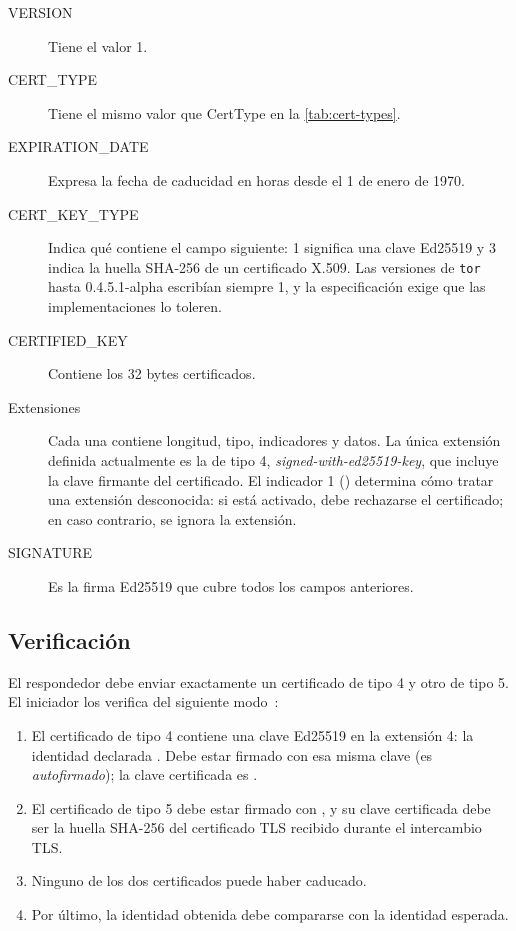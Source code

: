 \begin{description}
  \item[VERSION] Tiene el valor 1.
  \item[CERT\_TYPE] Tiene el mismo valor que CertType en la \cref{tab:cert-types}.
  \item[EXPIRATION\_DATE] Expresa la fecha de caducidad en horas desde el 1 de enero de 1970.
  \item[CERT\_KEY\_TYPE] Indica qué contiene el campo siguiente: 1 significa una clave Ed25519 y 3 indica la huella SHA-256 de un certificado X.509. Las versiones de \texttt{tor} hasta 0.4.5.1-alpha escribían siempre 1, y la especificación exige que las implementaciones lo toleren.
  \item[CERTIFIED\_KEY] Contiene los 32 bytes certificados.
  \item[Extensiones] Cada una contiene longitud, tipo, indicadores y datos. La única extensión definida actualmente es la de tipo 4, \emph{signed-with-ed25519-key}, que incluye la clave firmante del certificado. El indicador 1 () determina cómo tratar una extensión desconocida: si está activado, debe rechazarse el certificado; en caso contrario, se ignora la extensión.
  \item[SIGNATURE] Es la firma Ed25519 que cubre todos los campos anteriores.
\end{description}

\subsection{Verificación}\label{sec:canale-verifica}

El respondedor debe enviar exactamente un certificado de tipo 4 y otro de tipo 5. El iniciador los verifica del siguiente modo~:

\begin{enumerate}
  \item El certificado de tipo 4 contiene una clave Ed25519 en la extensión 4: la identidad declarada . Debe estar firmado con esa misma clave (es \emph{autofirmado}); la clave certificada es .
  \item El certificado de tipo 5 debe estar firmado con , y su clave certificada debe ser la huella SHA-256 del certificado TLS recibido durante el intercambio TLS.
  \item Ninguno de los dos certificados puede haber caducado.
  \item Por último, la identidad obtenida debe compararse con la identidad esperada.
\end{enumerate}

